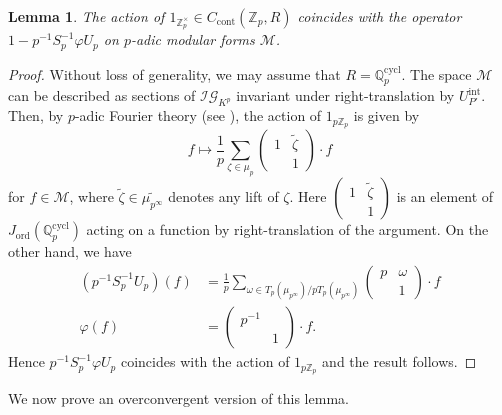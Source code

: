 \documentclass[10pt, oneside]{amsart}
\renewcommand{\tilde}{\widetilde}
\numberwithin{equation}{subsection}
\newtheorem{lemma}[equation]{Lemma}
\theoremstyle{definition}
\theoremstyle{remark}
\newcommand{\mbb}[1]{\mathbb{#1}}
\newcommand{\opn}[1]{\operatorname{#1}}
\newcommand{\tbyt}[4]{\left( \begin{matrix} #1 & #2 \\ #3 & #4 \end{matrix} \right)}
\begin{document}
\begin{lemma} \label{OrdPdepletionLemma}
    The action of $1_{\mbb{Z}_p^{\times}} \in C_{\opn{cont}}(\mbb{Z}_p, R)$ coincides with the operator $1 - p^{-1}S_p^{-1}\varphi U_p$ on $p$-adic modular forms $\mathscr{M}$.  
\end{lemma}
\begin{proof}
    Without loss of generality, we may assume that $R = \mbb{Q}_p^{\opn{cycl}}$. The space $\mathscr{M}$ can be described as sections of $\mathcal{IG}_{K^p}$ invariant under right-translation by $U_{P'}^{\opn{int}}$. Then, by $p$-adic Fourier theory (see \cite[\S 7.1]{howe2020unipotent}), the action of $1_{p\mbb{Z}_p}$ is given by
    \[
    f \mapsto \frac{1}{p} \sum_{\zeta \in \mu_p} \tbyt{1}{\tilde{\zeta}}{}{1} \cdot f
    \]
    for $f \in \mathscr{M}$, where $\tilde{\zeta} \in \tilde{\mu_{p^{\infty}}}$ denotes any lift of $\zeta$. Here $\left(\begin{smallmatrix} 1 & \tilde{\zeta} \\ & 1 \end{smallmatrix}\right)$ is an element of $J_{\opn{ord}}(\mbb{Q}_p^{\opn{cycl}})$ acting on a function by right-translation of the argument. On the other hand, we have
    \begin{align*}
        (p^{-1}S_p^{-1}U_p)(f) &= \frac{1}{p} \sum_{\omega \in T_p(\mu_{p^{\infty}})/p T_p(\mu_{p^{\infty}})} \tbyt{p}{\omega}{}{1} \cdot f \\
        \varphi(f) &= \tbyt{p^{-1}}{}{}{1} \cdot f .
    \end{align*}
    Hence $p^{-1}S_p^{-1}\varphi U_p$ coincides with the action of $1_{p\mbb{Z}_p}$ and the result follows.
\end{proof}

We now prove an overconvergent version of this lemma.
\end{document}
